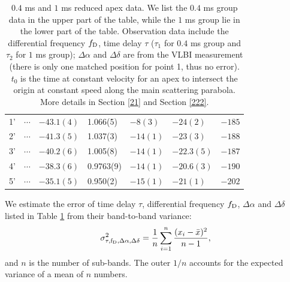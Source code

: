 \documentclass[useAMS,usenatbib]{mn2e}
\begin{document}
\begin{table}
\begin{tabular}{c|llllll}
1'&$ \cdots$ & $-43.1(4)$      & 1.066(5)    & $-8(3)$     & $-24(2)$   & $-185$   \\
2'&$\cdots$ & $-41.3(5)$    & 1.037(3)   & $-14(1)$     & $-23(3)$   & $-188$                                   \\
3'&$\cdots$ & $-40.2(6)$  & 1.005(8)    & $-14(1)$       & $-22.3(5)$  & $-187$                                   \\
4'&$\cdots$ & $-38.3(6)$  & 0.9763(9)   & $-14(1)$       & $-20.6(3)$  & $-190$                                    \\
5'&$\cdots$& $-35.1(5)$  & 0.950(2)   & $-15(1)$  & $-21(1)$   &$-202$                                   \\
 \hline                                 
\end{tabular}
\caption{ $0.4$ ms and $1$ ms reduced apex data. 
We list the $0.4$ ms group data in the upper part of the table, while the $1$ ms group lie in the lower part of the table. 
Observation data include the differential frequency $f_{\rm D}$, time delay
$\tau$ ($\tau_1$ for $0.4$ ms group and $\tau_2$ for $1$ ms group);
$\Delta\alpha$ and $\Delta\delta$ are from the VLBI measurement (there is only one matched position for point 1, thus no error). 
$t_0$ is the time at constant velocity for an apex to intersect the
origin at constant speed along the main scattering parabola.  More
details in Section \ref{21} and Section \ref{222}.
}
\label{table:apex}
\end{table}
We estimate the error of time delay $\tau$, differential frequency
$f_{\rm D}$, $\Delta\alpha$ and $\Delta\delta$  listed in Table
\ref{table:apex} from their band-to-band variance:
\begin{equation}
\sigma^2_{\rm \tau, f_{\rm D},\Delta\alpha, \Delta\delta} = \frac{1}{n}\sum^{n}_{i=1}\frac{(x_i-\bar{x})^2}{n-1},
\end{equation}
and $n$ is the number of sub-bands. The outer $1/n$ accounts for the expected variance of a mean of $n$ numbers.

\end{document}
